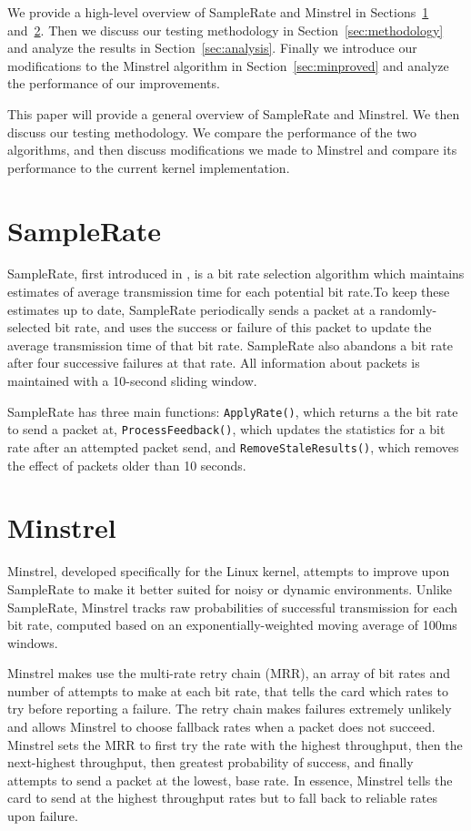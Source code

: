 \documentclass[twocolumn,10pt]{article}
\begin{document}
We provide a high-level overview of SampleRate and Minstrel in
Sections~\ref{sec:samplerate} and~\ref{sec:minstrel}.  Then we discuss
our testing methodology in Section~\ref{sec:methodology} and analyze
the results in Section~\ref{sec:analysis}.  Finally we introduce our
modifications to the Minstrel algorithm in Section~\ref{sec:minproved}
and analyze the performance of our improvements.

This paper will provide a general overview of SampleRate and Minstrel.
We then discuss our testing methodology.  We compare the performance
of the two algorithms, and then discuss modifications we made to
Minstrel and compare its performance to the current kernel
implementation.


\section{SampleRate} \label{sec:samplerate}

SampleRate, first introduced in \cite{samplerate}, is a bit rate
selection algorithm which maintains estimates of average transmission
time for each potential bit rate.To keep these estimates up to date,
SampleRate periodically sends a packet at a randomly-selected bit
rate, and uses the success or failure of this packet to update the
average transmission time of that bit rate.  SampleRate also abandons
a bit rate after four successive failures at that rate.  All
information about packets is maintained with a 10-second sliding window.

SampleRate has three main functions: \texttt{ApplyRate()}, which
returns a the bit rate to send a packet at,
\texttt{ProcessFeedback()}, which updates the statistics for a
bit rate after an attempted packet send, and
\texttt{RemoveStaleResults()}, which removes the effect of packets
older than 10 seconds.

\section{Minstrel} \label{sec:minstrel}

Minstrel, developed specifically for the Linux kernel, attempts to
improve upon SampleRate to make it better suited for noisy or
dynamic environments.  Unlike SampleRate, Minstrel tracks raw
probabilities of successful transmission for each bit rate, computed
based on an exponentially-weighted moving average of 100ms windows.

Minstrel makes use the multi-rate retry chain (MRR), an array of bit rates
and number of attempts to make at each bit rate, that tells the card
which rates to try before reporting a failure.  The retry chain makes
failures extremely unlikely and allows Minstrel to choose fallback
rates when a packet does not succeed.  Minstrel sets the MRR to first
try the rate with the highest throughput, then the next-highest
throughput, then greatest probability of success, and finally attempts
to send a packet at the lowest, base rate.  In essence, Minstrel tells
the card to send at the highest throughput rates but to fall back to
reliable rates upon failure.
\end{document}
